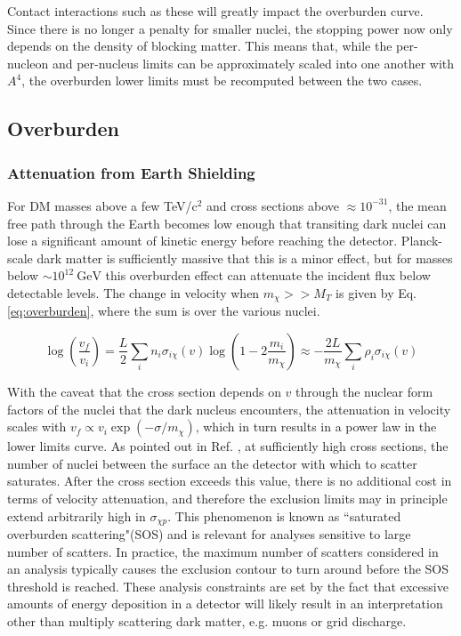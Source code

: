 Contact interactions such as these will greatly impact the overburden curve.
Since there is no longer a penalty for smaller nuclei, the stopping power now only depends on the density  of blocking matter.
This means that, while the per-nucleon and per-nucleus limits can be approximately scaled into one another with $A^4$, the overburden lower limits must be recomputed between the two cases.

\subsection{Overburden}
\label{sec:overburden}

\subsubsection{Attenuation from Earth Shielding}

 For DM masses above a few TeV/c$^2$ and cross sections above $\approx 10^{-31}$, the mean free path through the Earth becomes low enough that transiting dark nuclei can lose a significant amount of kinetic energy before reaching the detector.
Planck-scale dark matter is sufficiently massive that this is a minor effect, but for masses below $\sim 10^{12} \mathrm{~GeV}$ this overburden effect can attenuate the incident flux below detectable levels.
The change in velocity when $m_\chi >> M_T$ is given by Eq. \ref{eq:overburden}, where the sum is over the various nuclei\cite{bramante_saturated_2018}. 

\begin{equation}
    \log(\frac{v_f}{v_i}) = \frac{L}{2} \sum_i n_i \sigma_{i \chi}(v) \log (1- 2\frac{m_i}{m_\chi}) \approx -\frac{2L}{m_\chi}  \sum_i \rho_i \sigma_{i \chi}(v)
    \label{eq:overburden}
\end{equation}

With the caveat that the cross section depends on $v$ through the nuclear form factors of the nuclei that the dark nucleus encounters, the attenuation in velocity scales with $v_f \propto v_i \exp(-\sigma/m_\chi)$, which in turn results in a power law in the lower limits curve.
As pointed out in Ref. \cite{bramante_saturated_2018}, at sufficiently high cross sections, the number of nuclei between the surface an the detector with which to scatter saturates.
After the cross section exceeds this value, there is no additional cost in terms of velocity attenuation, and therefore the exclusion limits may in principle extend arbitrarily high in $\sigma_{\chi p}$.
This phenomenon is known as ``saturated overburden scattering"(SOS) and is relevant for analyses sensitive to large number of scatters.
In practice, the maximum number of scatters considered in an analysis typically causes the exclusion contour to turn around before the SOS threshold is reached. 
These analysis constraints are set by the fact that excessive amounts of energy deposition in a detector will likely result in an interpretation other than multiply scattering dark matter, e.g. muons or grid discharge.


